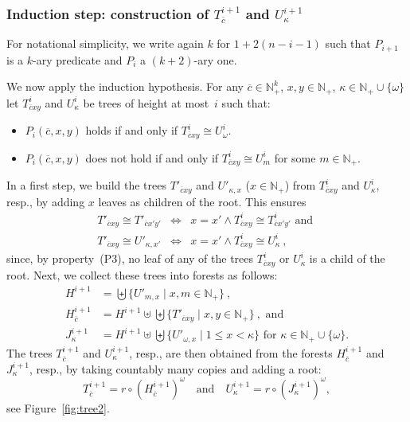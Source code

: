 \documentclass[envcountsame]{llncs}
\newcommand{\N}{\mathbb N}
\begin{document}
\subsubsection{Induction step: construction of $T^{i+1}_{\overline{c}}$
and  $U^{i+1}_\kappa$} \label{sec-induction-trees}

For notational simplicity, we write again $k$ for $1+2(n-i-1)$ such
that $P_{i+1}$ is a $k$-ary predicate and $P_i$ a $(k+2)$-ary one.


We now apply the induction hypothesis. For any
$\overline{c} \in \N_+^k$, $x,y \in \N_+$, $\kappa \in \N_+ \cup \{\omega\}$
let $T^{i}_{\overline{c}xy}$ and
$U^i_\kappa$ be trees of height at most~$i$
such that:
\begin{itemize}
\item $P_i(\overline{c},x,y)$ holds if and only if
  $T^i_{\overline{c}xy} \cong U^i_\omega$.
\item $P_i(\overline{c},x,y)$ does not hold if and only if
  $T^i_{\overline{c}xy} \cong U^i_m$ for some $m \in \N_+$.
\end{itemize}
In a first step, we build the trees $T'_{\overline{c}xy}$ and
$U'_{\kappa,x}$ ($x \in \N_+$) from $T^i_{\overline{c}xy}$
and $U^i_\kappa$, resp., by adding $x$ leaves as
children of the root. This ensures
\begin{eqnarray}
    T'_{\overline{c}xy}\cong T'_{\overline{c}x'y'} &\iff&
      x=x' \wedge T^i_{\overline{c}xy}\cong T^i_{\overline{c}x'y'}\text{ and }
       \label{eqt:tree_T'(P)}\\
    T'_{\overline{c}xy} \cong U'_{\kappa,x'} &\iff&
    x=x' \wedge T^i_{\overline{c}xy}\cong U^i_\kappa\ ,
       \label{eqt:tree_U'}
\end{eqnarray}
since, by property~(P3), no leaf of any of the trees $T^i_{\overline{c}xy}$ or $U^i_\kappa$ is a child of the
root. Next, we collect these trees into forests as follows:
\begin{align*}
  H^{i+1} & = \biguplus\{ U'_{m,x} \mid x,m\in \N_+\}\ ,\\
  H^{i+1}_{\overline c}
    & = H^{i+1}\uplus\biguplus \{ T'_{\overline{c}xy} \mid x,y\in \N_+\}\ ,\text{ and }\\
  J^{i+1}_\kappa & = H^{i+1}\uplus
               \biguplus\{ U'_{\omega,x} \mid 1 \leq x < \kappa \}\text{ for } \kappa \in
               \N_+ \cup \{\omega\} .
\end{align*}
The trees $T^{i+1}_{\overline c}$ and $U^{i+1}_\kappa$, resp., are then obtained from
the forests $H^{i+1}_{\overline c}$ and $J^{i+1}_\kappa$, resp., by
taking countably many copies and adding a root:
\begin{equation}\label{def-tree-from-forest-i+1}
   T^{i+1}_{\overline c} = r\circ (H^{i+1}_{\overline c})^\omega \quad\text{and}\quad
   U^{i+1}_\kappa = r\circ (J^{i+1}_\kappa)^\omega,
\end{equation}
see Figure~\ref{fig:tree2}.
\end{document}

